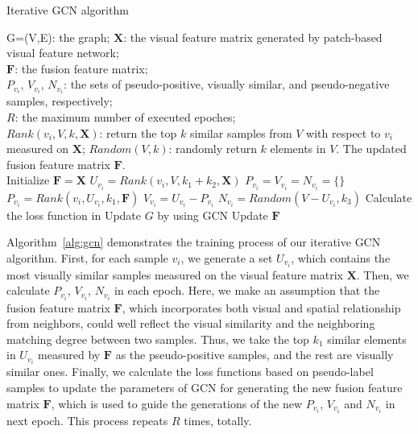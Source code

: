 \documentclass[10pt,twocolumn,letterpaper]{article}
\begin{document}
\begin{algorithm} \label{alg:gcn}
	\caption{Iterative GCN algorithm}  
	\begin{algorithmic} %
		\Require G=(V,E): the graph;
		\State $\boldsymbol{X}$: the visual feature matrix generated by patch-based visual feature network; \\
		$\boldsymbol{F}$: the fusion feature matrix; \\
		$P_{v_i}$, $V_{v_i}$, $N_{v_i}$: the sets of pseudo-positive, visually similar, and pseudo-negative samples, respectively; \\
		$R$: the maximum number of executed epoches; \\
		$Rank(v_i,V,k,\boldsymbol{X})$: return the top $k$ similar samples from $V$ with respect to $v_i$ measured on $\boldsymbol{X}$;
		$Random(V, k)$: randomly return $k$ elements in $V$.
		\Ensure The updated fusion feature matrix $\boldsymbol{F}$. \\
		Initialize $\boldsymbol{F}=\boldsymbol{X}$
			\State $U_{v_i} = Rank(v_i,V,k_1+k_2, \boldsymbol{X})$
		\EndFor
				\State $P_{v_i}=V_{v_i}=N_{v_i}=\{\}$
				\State $P_{v_i}=Rank(v_i,U_{v_i},k_1,\boldsymbol{F})$
				\State $V_{v_i}=U_{v_i}-P_{v_i}$
				\State $N_{v_i}=Random(V-U_{v_i},k_3)$
			\EndFor
			\State Calculate the loss function in 
			\State Update $G$ by using GCN
			\State Update $\boldsymbol{F}$
		\EndFor
		
	\end{algorithmic}  
\end{algorithm}

Algorithm~\ref{alg:gcn} demonstrates the training process of our iterative GCN algorithm.
First, for each sample $v_i$, we generate a set $U_{v_i}$, which contains the most visually similar samples measured on the visual feature matrix $\boldsymbol{X}$.
Then, we calculate $P_{v_i}$, $V_{v_i}$, $N_{v_i}$ in each epoch.
Here, we make an assumption that the fusion feature matrix $\boldsymbol{F}$, which incorporates both visual and spatial relationship from neighbors, could well reflect the visual similarity and the neighboring matching degree between two samples.
Thus, we take the top $k_1$ similar elements in $U_{v_i}$ measured by $\boldsymbol{F}$ as the pseudo-positive samples, and the rest are visually similar ones. 
Finally, we calculate the loss functions based on pseudo-label samples to update the parameters of GCN for generating the new fusion feature matrix $\boldsymbol{F}$, which is used to guide the generations of the new $P_{v_i}$, $V_{v_i}$ and $N_{v_i}$ in next epoch.
This process repeats $R$ times, totally.
\end{document}
